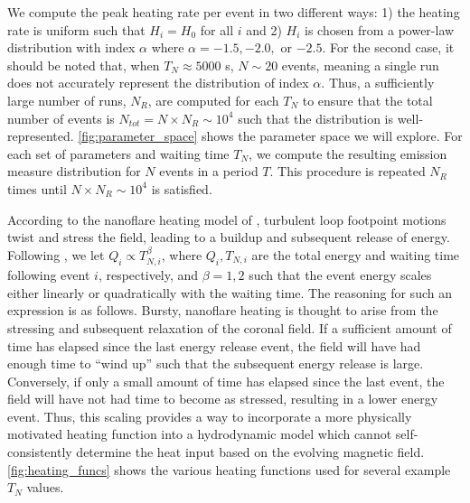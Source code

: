 \documentclass[apj]{emulateapj}
\begin{document}
	\par We compute the peak heating rate per event in two different ways: 1) the heating rate is uniform such that $H_i=H_0$ for all $i$ and 2) $H_i$ is chosen from a power-law distribution with index $\alpha$ where $\alpha=-1.5,-2.0,$ or $-2.5$. For the second case, it should be noted that, when $T_N\approx5000$ s, $N\sim20$ events, meaning a single run does not accurately represent the distribution of index $\alpha$. Thus, a sufficiently large number of runs, $N_{R}$, are computed for each $T_N$ to ensure that the total number of events is $N_{tot}=N\times N_{R}\sim10^4$ such that the distribution is well-represented. \autoref{fig:parameter_space} shows the parameter space we will explore. For each set of parameters and waiting time $T_N$, we compute the resulting emission measure distribution for $N$ events in a period $T$. This procedure is repeated $N_R$ times until $N\times N_R\sim10^4$ is satisfied.
	\par According to the nanoflare heating model of \citet{parker_nanoflares_1988}, turbulent loop footpoint motions twist and stress the field, leading to a buildup and subsequent release of energy. Following \citet{cargill_active_2014}, we let $Q_i\propto T_{N,i}^{\beta}$, where $Q_i,T_{N,i}$ are the total energy and waiting time following event $i$, respectively, and $\beta=1,2$ such that the event energy scales either linearly or quadratically with the waiting time. The reasoning for such an expression is as follows. Bursty, nanoflare heating is thought to arise from the stressing and subsequent relaxation of the coronal field. If a sufficient amount of time has elapsed since the last energy release event, the field will have had enough time to ``wind up'' such that the subsequent energy release is large. Conversely, if only a small amount of time has elapsed since the last event, the field will have not had time to become as stressed, resulting in a lower energy event. Thus, this scaling provides a way to incorporate a more physically motivated heating function into a hydrodynamic model which cannot self-consistently determine the heat input based on the evolving magnetic field. \autoref{fig:heating_funcs} shows the various heating functions used for several example $T_N$ values.
\end{document}
